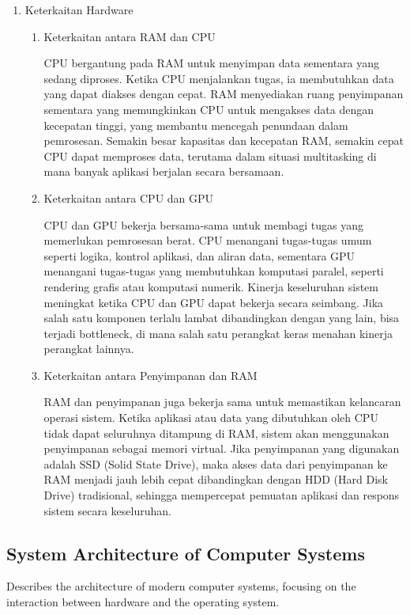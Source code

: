 \documentclass[12pt]{article}
\begin{document}
\begin{enumerate}
    \item {Keterkaitan Hardware}
    \par \begin{enumerate}
        \item {{Keterkaitan antara RAM dan CPU}}
        \par CPU bergantung pada RAM untuk menyimpan data sementara yang sedang diproses. Ketika CPU menjalankan tugas, ia membutuhkan data yang dapat diakses dengan cepat. RAM menyediakan ruang penyimpanan sementara yang memungkinkan CPU untuk mengakses data dengan kecepatan tinggi, yang membantu mencegah penundaan dalam pemrosesan. Semakin besar kapasitas dan kecepatan RAM, semakin cepat CPU dapat memproses data, terutama dalam situasi multitasking di mana banyak aplikasi berjalan secara bersamaan.
    
        \item {{Keterkaitan antara CPU dan GPU}}
        \par CPU dan GPU bekerja bersama-sama untuk membagi tugas yang memerlukan pemrosesan berat. CPU menangani tugas-tugas umum seperti logika, kontrol aplikasi, dan aliran data, sementara GPU menangani tugas-tugas yang membutuhkan komputasi paralel, seperti rendering grafis atau komputasi numerik. Kinerja keseluruhan sistem meningkat ketika CPU dan GPU dapat bekerja secara seimbang. Jika salah satu komponen terlalu lambat dibandingkan dengan yang lain, bisa terjadi bottleneck, di mana salah satu perangkat keras menahan kinerja perangkat lainnya.
    
        \item {{Keterkaitan antara Penyimpanan dan RAM}}
        \par RAM dan penyimpanan juga bekerja sama untuk memastikan kelancaran operasi sistem. Ketika aplikasi atau data yang dibutuhkan oleh CPU tidak dapat seluruhnya ditampung di RAM, sistem akan menggunakan penyimpanan sebagai memori virtual. Jika penyimpanan yang digunakan adalah SSD (Solid State Drive), maka akses data dari penyimpanan ke RAM menjadi jauh lebih cepat dibandingkan dengan HDD (Hard Disk Drive) tradisional, sehingga mempercepat pemuatan aplikasi dan respons sistem secara keseluruhan.
    
    \end{enumerate}

\end{enumerate}

\subsection{System Architecture of Computer Systems}
Describes the architecture of modern computer systems, focusing on the interaction between hardware and the operating system.
\end{document}
